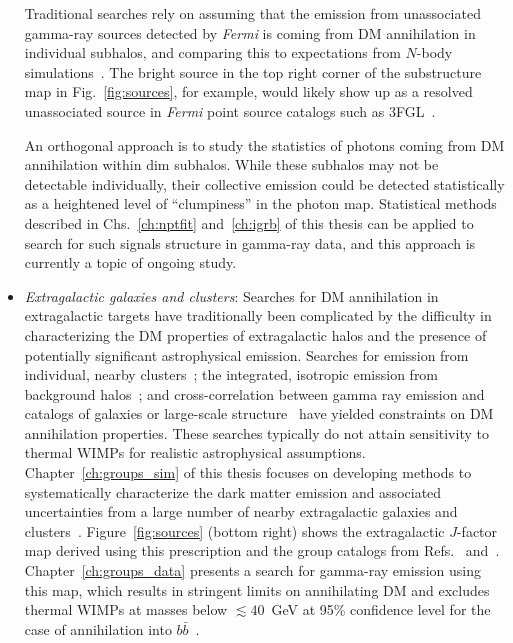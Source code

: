 \begin{itemize}
Traditional searches rely on assuming that the emission from unassociated gamma-ray sources detected by \emph{Fermi} is coming from DM annihilation in individual subhalos, and comparing this to expectations from $N$-body simulations~\cite{Bertoni:2015mla,Calore:2016ogv,Hooper:2016cld,Schoonenberg:2016aml}. The bright source in the top right corner of the substructure map in Fig.~\ref{fig:sources}, for example, would likely show up as a resolved unassociated source in \emph{Fermi} point source catalogs such as 3FGL~\cite{Acero:2015hja}.

An orthogonal approach is to study the statistics of photons coming from DM annihilation within dim subhalos. While these subhalos may not be detectable individually, their collective emission could be detected statistically as a heightened level of ``clumpiness'' in the photon map. Statistical methods described in Chs.~\ref{ch:nptfit} and~\ref{ch:igrb} of this thesis can be applied to search for such signals structure in gamma-ray data, and this approach is currently a topic of ongoing study.

\item \emph{Extragalactic galaxies and clusters}: Searches for DM annihilation in extragalactic targets have traditionally been complicated by the difficulty in characterizing the DM properties of extragalactic halos and the presence of potentially significant astrophysical emission. Searches for emission from individual, nearby clusters~\cite{Ackermann:2015fdi}; the integrated, isotropic emission from background halos~\cite{Ackermann:2015tah,Ajello:2015mfa,Cholis:2013ena,DiMauro:2015tfa}; and cross-correlation between gamma ray emission and catalogs of galaxies or large-scale structure~\cite{Ando:2013xwa,Ando:2014aoa,Ando:2016ang,Cuoco:2015rfa,Regis:2015zka,Xia:2015wka,Shirasaki:2014noa,Shirasaki:2015nqp,Shirasaki:2016kol,Troster:2016sgf} have yielded constraints on DM annihilation properties. These searches typically do not attain sensitivity to thermal WIMPs for realistic astrophysical assumptions. Chapter~\ref{ch:groups_sim} of this thesis focuses on developing methods to systematically characterize the dark matter emission and associated uncertainties from a large number of nearby extragalactic galaxies and clusters~\cite{Lisanti:2017qoz}. Figure~\ref{fig:sources} (bottom right) shows the extragalactic $J$-factor map derived using this prescription and the group catalogs from Refs.~\cite{Tully:2015opa} and~\cite{2017ApJ...843...16K}. Chapter~\ref{ch:groups_data} presents a search for gamma-ray emission using this map, which results in stringent limits on annihilating DM and excludes thermal WIMPs at masses below $\lesssim 40$~GeV at 95\% confidence level for the case of annihilation into $b\bar b$~\cite{Lisanti:2017qlb}.
\end{itemize}

